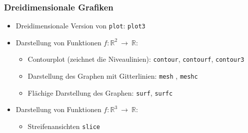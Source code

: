 % 
% 
% 
\begin{frame}[fragile]\frametitle{Dreidimensionale Grafiken}
\begin{itemize}
\item Dreidimensionale Version von \lstinline!plot!: \alert{ \lstinline!plot3!}
\item Darstellung von Funktionen $f:\mathbb{R}^2 \ \rightarrow \
  \mathbb{R}$:
\begin{itemize}
\item Contourplot (zeichnet die Niveaulinien): \alert{ \lstinline!contour!}, \alert{
    \lstinline!contourf!}, \alert{ \lstinline!contour3!}
\item Darstellung des Graphen mit Gitterlinien: \alert{ \lstinline!mesh! ,
  \lstinline!meshc!} 
\item Flächige Darstellung des Graphen: \alert{ \lstinline!surf!, \lstinline!surfc!}
\end{itemize} 
\item Darstellung von Funktionen $f:\mathbb{R}^3 \ \rightarrow \
  \mathbb{R}$:
\begin{itemize}
\item Streifenansichten \alert{ \lstinline!slice!}
\end{itemize}
\end{itemize}
\end{frame}

